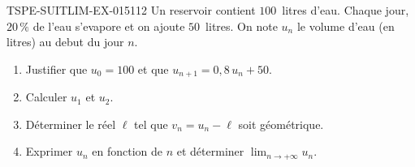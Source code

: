 \begin{exercice}{TSPE-SUITLIM-EX-015}{1}{12}
Un reservoir contient $100$~litres d'eau. Chaque jour, $20\,\%$ de l'eau s'evapore et on ajoute $50$~litres. On note $u_n$ le volume d'eau (en litres) au debut du jour $n$.
\begin{enumerate}
  \item Justifier que $u_0 = 100$ et que $u_{n+1} = 0{,}8\,u_n + 50$.
  \item Calculer $u_1$ et $u_2$.
  \item Déterminer le réel $\ell$ tel que $v_n = u_n - \ell$ soit géométrique.
  \item Exprimer $u_n$ en fonction de $n$ et déterminer $\lim_{n \to +\infty} u_n$.
\end{enumerate}
\end{exercice}
